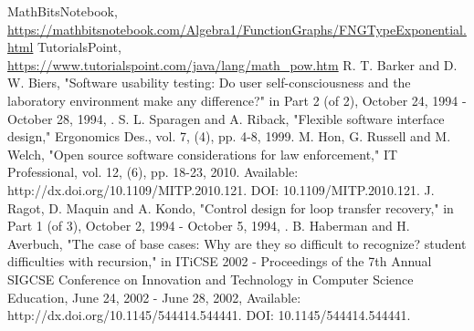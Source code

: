 \documentclass[a4paper, 11pt]{article}
\begin{document}
\newpage
\begin{thebibliography}{9}
MathBitsNotebook,\\
\url{https://mathbitsnotebook.com/Algebra1/FunctionGraphs/FNGTypeExponential.html}
TutorialsPoint,\\
\url{https://www.tutorialspoint.com/java/lang/math_pow.htm}
 R. T. Barker and D. W. Biers,   "Software usability testing: Do user self-consciousness and the laboratory environment make any difference?" in Part 2 (of 2), October 24, 1994 - October 28, 1994, .
  S. L. Sparagen and A. Riback, "Flexible software interface design," Ergonomics Des., vol. 7, (4), pp. 4-8, 1999.
 M. Hon, G. Russell and M. Welch, "Open source software considerations for law enforcement," IT Professional, vol. 12, (6), pp. 18-23, 2010. Available: http://dx.doi.org/10.1109/MITP.2010.121. DOI: 10.1109/MITP.2010.121.
 J. Ragot, D. Maquin and A. Kondo, "Control design for loop transfer recovery," in Part 1 (of 3), October 2, 1994 - October 5, 1994, .
 B. Haberman and H. Averbuch, "The case of base cases: Why are they so difficult to recognize? student difficulties with recursion," in ITiCSE 2002 - Proceedings of the 7th Annual SIGCSE Conference on Innovation and Technology in Computer Science Education, June 24, 2002 - June 28, 2002, Available: http://dx.doi.org/10.1145/544414.544441. DOI: 10.1145/544414.544441.
\end{thebibliography}
\end{document}
